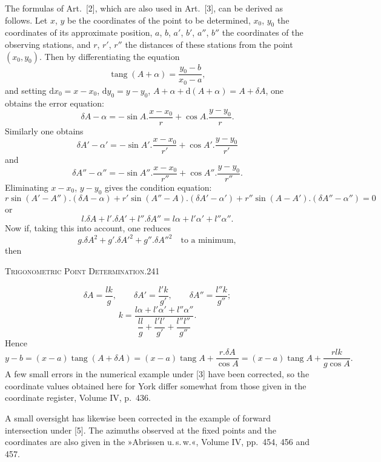 The formulas of Art.~[2], which are also used in Art.~[3], can be derived as follows. Let $x$, $y$ be the coordinates of the point to be determined, $x_0$, $y_0$ the coordinates of its approximate position, $a$, $b$, $a'$, $b'$, $a''$, $b''$ the coordinates of the observing stations, and $r$, $r'$, $r''$ the distances of these stations from the point $(x_0,y_0)$. Then by differentiating the equation
\[
\operatorname{tang}(A+\alpha)=\frac{y_0-b}{x_0-a},
\]
and setting $\mathrm dx_0=x-x_0$, $\mathrm dy_0=y-y_0$, $A+\alpha+\mathrm d(A+\alpha)=A+\delta A$, one obtains the error equation:
\[
\delta A-\alpha=-\sin A.\frac{x-x_0}{r}+\cos A.\frac{y-y_0}{r}.
\]
Similarly one obtains
\[
\delta A'-\alpha'=-\sin A'.\frac{x-x_0}{r'}+\cos A'.\frac{y-y_0}{r'}
\]
and
\[
\delta A''-\alpha''=-\sin A''.\frac{x-x_0}{r''}+\cos A''.\frac{y-y_0}{r''}.
\]
Eliminating $x-x_0$, $y-y_0$ gives the condition equation:
\[
r\sin(A'-A'').(\delta A-\alpha)+r'\sin(A''-A).(\delta A'-\alpha')+r''\sin(A-A').(\delta A''-\alpha'')=0
\]
or
\[
l.\delta A+l'.\delta A'+l''.\delta A''=l\alpha+l'\alpha'+l''\alpha''.
\]
Now if, taking this into account, one reduces
\[
g.\delta A^2+g'.\delta A'^2+g''.\delta A''^2\quad\text{to a minimum},
\]
then
\par\endgroup

\clearpage
\noindent\mbox{}\hfill\textsc{Trigonometric Point Determination.}\hfill241\par\medskip
\begingroup\footnotesize
\[
\delta A=\frac{lk}{g},\qquad\delta A'=\frac{l'k}{g'},\qquad\delta A''=\frac{l''k}{g''};
\]
\[
k=\frac{l\alpha+l'\alpha'+l''\alpha''}{\dfrac{ll}{g}+\dfrac{l'l'}{g'}+\dfrac{l''l''}{g''}}.
\]
Hence
\[
y-b=(x-a)\operatorname{tang}(A+\delta A)=(x-a)\operatorname{tang}A+\frac{r.\delta A}{\cos A}
=(x-a)\operatorname{tang}A+\frac{rlk}{g\cos A}.
\]
A few small errors in the numerical example under [3] have been corrected, so the coordinate values obtained here for York differ somewhat from those given in the coordinate register, Volume IV, p.~436.

A small oversight has likewise been corrected in the example of forward intersection under [5]. The azimuths observed at the fixed points and the coordinates are also given in the »Abrissen u.\,s.\,w.«, Volume IV, pp.~454, 456 and 457.

